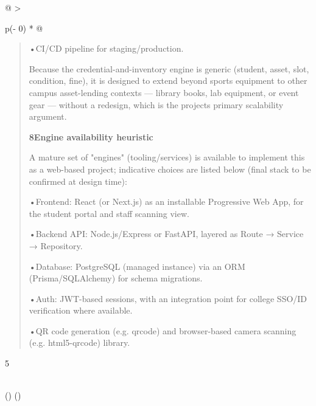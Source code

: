 \documentclass[
]{article}
\begin{document}
\begin{longtable}[]{@{}
  >{\raggedright\arraybackslash}p{(\columnwidth - 0\tabcolsep) * }@{}}
\begin{minipage}[b]{\linewidth}
\begin{quote}
•CI/CD pipeline for staging/production.

Because the credential-and-inventory engine is generic (student, asset,
slot, condition, fine), it is designed to extend beyond sports equipment
to other campus asset-lending contexts --- library books, lab equipment,
or event gear --- without a redesign, which is the
project\textquotesingle s primary scalability argument.

\textbf{8Engine availability heuristic}

A mature set of "engines" (tooling/services) is available to implement
this as a web-based project; indicative choices are listed below (final
stack to be confirmed at design time):

•Frontend: React (or Next.js) as an installable Progressive Web App, for
the student portal and staff scanning view.

•Backend API: Node.js/Express or FastAPI, layered as Route → Service →
Repository.

•Database: PostgreSQL (managed instance) via an ORM (Prisma/SQLAlchemy)
for schema migrations.

•Auth: JWT-based sessions, with an integration point for college SSO/ID
verification where available.

•QR code generation (e.g. qrcode) and browser-based camera scanning
(e.g. html5-qrcode) library.
\end{quote}

5
\end{minipage} \\
\midrule()
\endhead
\bottomrule()
\end{longtable}
\end{document}
